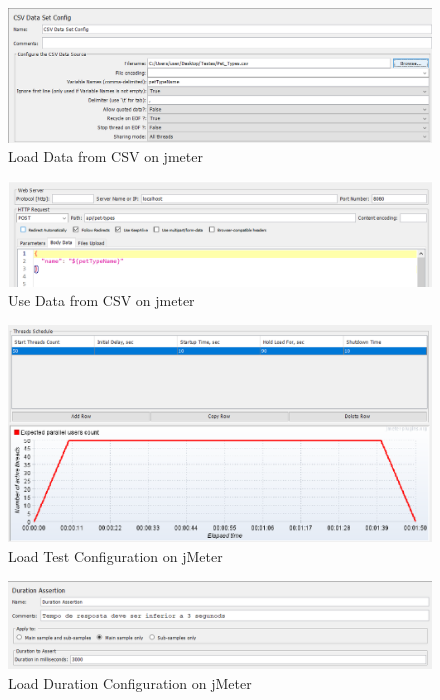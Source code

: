 \documentclass[a4paper,11pt,openright,BCOR=15mm]{scrbook}
\begin{document}
\begin{figure}[H]
	\centering
	\includegraphics[width=\textwidth]{figs/Performance/jmeter/loadcsvJmeter.png}
	\caption{Load Data from CSV on jmeter}
	\label{fig:LoadCSVjmeter}
\end{figure}

\begin{figure}[H]
	\centering
	\includegraphics[width=\textwidth]{figs/Performance/jmeter/loadcsv2Jmeter.png}
	\caption{Use Data from CSV on jmeter}
	\label{fig:LoadCSV2jmeter}
\end{figure}

\begin{figure}[H]
	\centering
	\includegraphics[width=\textwidth]{figs/Performance/jmeter/LoadJmeterConfiguration.png}
	\caption{Load Test Configuration on jMeter}
	\label{fig:LoadConfigurationjMeter}
\end{figure}

\begin{figure}[H]
	\centering
	\includegraphics[width=\textwidth]{figs/Performance/jmeter/Load-SoakJmeterDurationAssertion.png}
	\caption{Load Duration Configuration on jMeter}
	\label{fig:LoadDurationjMeter}
\end{figure}
\end{document}
